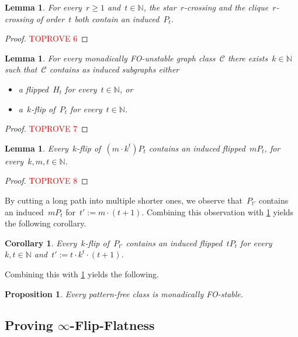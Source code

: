 \documentclass[11pt]{article}      \usepackage[margin=1in]{geometry}  \usepackage{microtype}
\newtheorem{corollary}[theorem]{Corollary}
\newtheorem{lemma}[theorem]{Lemma}
\newtheorem{proposition}[theorem]{Proposition}
\theoremstyle{definition}
\newcommand{\N}[0]{\mathrm{\mathbb{N}}}
\newcommand{\CC}{\mathcal{C}}
\renewcommand{\ge}{\geqslant}
\renewcommand{\geq}{\ge}
\begin{document}
\begin{lemma}\label{lem:crossing-to-path}
  For every~$r\geq 1$ and~$t \in \N$, the star~$r$-crossing and the clique~$r$-crossing of order~$t$ both contain an induced~$P_t$.
\end{lemma}
\begin{proof}\textcolor{red}{TOPROVE 6}\end{proof}

\begin{lemma}\label{lem:fo-unstable-to-ideal-patterns}
  For every monadically FO-unstable graph class~$\CC$ there exists~$k\in\N$ such that~$\CC$ contains as induced subgraphs either
  \begin{itemize}
    \item a flipped~$H_t$ for every~$t\in\N$, or
    \item a~$k$-flip of~$P_t$ for every~$t \in \N$.
  \end{itemize}
\end{lemma}
\begin{proof}\textcolor{red}{TOPROVE 7}\end{proof}



\begin{lemma}\label{lem:pigeonhole-swimlane}
  Every~$k$-flip of~$(m \cdot k^t)P_t$ contains an induced flipped~$mP_t$, for every~$k,m,t \in \N$.
\end{lemma}
\begin{proof}\textcolor{red}{TOPROVE 8}\end{proof}

By cutting a long path into multiple shorter ones, we observe that~$P_{t'}$ contains an induced~$mP_t$ for~$t' := m \cdot (t + 1)$. 
Combining this observation with \cref{lem:pigeonhole-swimlane} yields the following corollary.

\begin{corollary}\label{lem:path-to-swimlane}
  Every~$k$-flip of~$P_{t'}$ contains an induced flipped~$tP_t$ for
  every~$k,t \in\N$ and~$t':= t \cdot k^t \cdot (t+1)$.
\end{corollary}


Combining this with \cref{lem:fo-unstable-to-ideal-patterns} yields the following.

\begin{proposition}\label{prop:pattern-free-fo-stable}
  Every pattern-free class is monadically FO-stable.
\end{proposition}

\subsection{Proving \texorpdfstring{$\infty$-Flip-Flatness}{infty-Flip-Flatness}}
\end{document}

